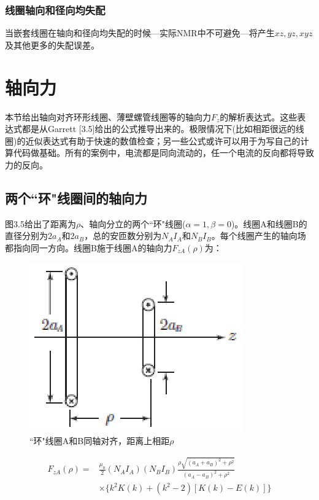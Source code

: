 \subsubsection{线圈轴向和径向均失配}
当嵌套线圈在轴向和径向均失配的时候---实际NMR中不可避免---将产生$xz,yz,xyz$及其他更多的失配误差。

\section{轴向力}
本节给出轴向对齐环形线圈、薄壁螺管线圈等的轴向力$F_z$的解析表达式。这些表达式都是从Garrett [3.5]给出的公式推导出来的。极限情况下(比如相距很远的线圈)的近似表达式有助于快速的数值检查；另一些公式或许可以用于为写自己的计算代码做基础。所有的案例中，电流都是同向流动的，任一个电流的反向都将导致力的反向。

\subsection{两个``环"线圈间的轴向力}
图3.5给出了距离为$\rho$、轴向分立的两个``环"线圈($\alpha=1,\beta=0$)。线圈A和线圈B的直径分别为$2a_A$和$2a_B$，总的安匝数分别为$N_A I_A$和$N_B I_B$。每个线圈产生的轴向场都指向同一方向。线圈B施于线圈A的轴向力$F_{zA}(\rho)$为：
\begin{figure}[htbp]
	\centering
	\includegraphics[scale=1]{chpt3/figs/fig3.5.eps}
	\caption{``环"线圈A和B同轴对齐，距离上相距$\rho$}
\end{figure}

\begin{equation}
\begin{split}
  F_{zA}(\rho)=&\frac{\mu_0}{2}(N_A I_A)(N_B I_B)\frac{\rho\sqrt{(a_A+a_B)^2+\rho^2}}{(a_A-a_B)^2+\rho^2}\\
  &\times\{k^2 K(k)+(k^2-2)[K(k)-E(k)]\}
\end{split}
\end{equation}

